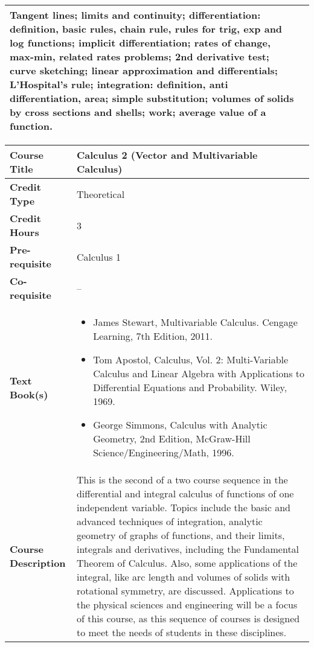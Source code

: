 \documentclass[11pt]{article}
\begin{document}
\begin{table}[h!]
\begin{tabular}{|l|l|}
\begin{minipage}{.70\textwidth}
Tangent lines; limits and continuity; differentiation: definition, basic rules, chain rule, rules for trig, exp and log functions; implicit differentiation; rates of change, max-min, related rates problems; 2nd derivative test; curve sketching; linear approximation and differentials; L'Hospital's rule; integration: definition, anti differentiation, area; simple substitution; volumes of solids by cross sections and shells; work; average value of a function.

\vspace{3mm}
\end{minipage} \\ \hline
\end{tabular}
\end{table}


\begin{table}[h!]
\begin{tabular}{|l|l|}
\hline
\textbf{Course Title}       &   Calculus 2 (Vector and Multivariable Calculus) \\ \hline
\textbf{Credit Type}        &  Theoretical \\ \hline
\textbf{Credit Hours}       & 3 \\ \hline
\textbf{Pre-requisite}       & Calculus 1  \\ \hline
\textbf{Co-requisite}       & -- \\ \hline
\textbf{Text Book(s)}       & \begin{minipage}{.70\textwidth}
\begin{itemize} \itemsep-0.4em
	\vspace{3mm}
	\item James Stewart, Multivariable Calculus. Cengage Learning, 7th Edition, 2011.
	\item Tom Apostol, Calculus, Vol. 2: Multi-Variable Calculus and Linear Algebra with Applications to Differential Equations and Probability. Wiley, 1969.
	\item George Simmons, Calculus with Analytic Geometry, 2nd Edition, McGraw-Hill Science/Engineering/Math, 1996.
	\vspace{3mm}
\end{itemize}
\end{minipage}\\ \hline
\textbf{Course Description} & \begin{minipage}{.70\textwidth}
\vspace{3mm}

This is the second of a two course sequence in the differential and integral calculus of functions of one independent variable. Topics include the basic and advanced techniques of integration, analytic geometry of graphs of functions, and their limits, integrals and derivatives, including the Fundamental Theorem of Calculus. Also, some applications of the integral, like arc length and volumes of solids with rotational symmetry, are discussed. Applications to the physical sciences and engineering will be a focus of this course, as this sequence of courses is designed to meet the needs of students in these disciplines.
\newline


\end{minipage}
\end{tabular}
\end{table}
\end{document}
